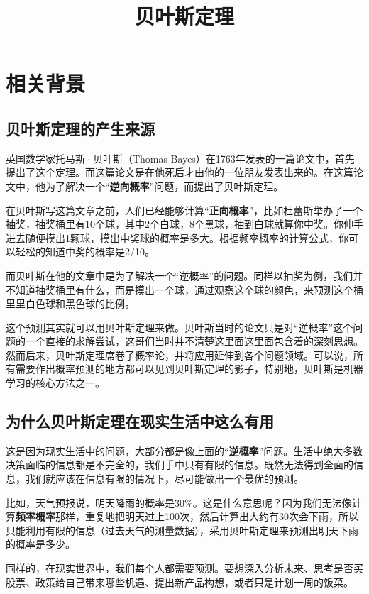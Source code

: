 \documentclass[12pt]{article}
\title{贝叶斯定理\cite{Fantastic_Bayesian_Common_Deduction}\cite{Common_Bayesian_Theory}\cite{Bayesian_Theory_With_Three_Examples}\cite{How_You_Understand_Bayesian}}
\begin{document}
\maketitle
\tableofcontents

\section{相关背景}
\subsection{贝叶斯定理的产生来源}
英国数学家托马斯·贝叶斯（Thomas Bayes）在1763年发表的一篇论文中，首先提出了这个定理。而这篇论文是在他死后才由他的一位朋友发表出来的。在这篇论文中，他为了解决一个“\textbf{逆向概率}”问题，而提出了贝叶斯定理。

在贝叶斯写这篇文章之前，人们已经能够计算“\textbf{正向概率}”，比如杜蕾斯举办了一个抽奖，抽奖桶里有10个球，其中2个白球，8个黑球，抽到白球就算你中奖。你伸手进去随便摸出1颗球，摸出中奖球的概率是多大。根据频率概率的计算公式，你可以轻松的知道中奖的概率是2/10。

而贝叶斯在他的文章中是为了解决一个“逆概率”的问题。同样以抽奖为例，我们并不知道抽奖桶里有什么，而是摸出一个球，通过观察这个球的颜色，来预测这个桶里里白色球和黑色球的比例。

这个预测其实就可以用贝叶斯定理来做。贝叶斯当时的论文只是对“逆概率”这个问题的一个直接的求解尝试，这哥们当时并不清楚这里面这里面包含着的深刻思想。然而后来，贝叶斯定理席卷了概率论，并将应用延伸到各个问题领域。可以说，所有需要作出概率预测的地方都可以见到贝叶斯定理的影子，特别地，贝叶斯是机器学习的核心方法之一。

\subsection{为什么贝叶斯定理在现实生活中这么有用}
这是因为现实生活中的问题，大部分都是像上面的“\textbf{逆概率}”问题。生活中绝大多数决策面临的信息都是不完全的，我们手中只有有限的信息。既然无法得到全面的信息，我们就应该在信息有限的情况下，尽可能做出一个最优的预测。

比如，天气预报说，明天降雨的概率是30\%。这是什么意思呢？因为我们无法像计算\textbf{频率概率}那样，重复地把明天过上100次，然后计算出大约有30次会下雨，所以只能利用有限的信息（过去天气的测量数据），采用贝叶斯定理来预测出明天下雨的概率是多少。

同样的，在现实世界中，我们每个人都需要预测。要想深入分析未来、思考是否买股票、政策给自己带来哪些机遇、提出新产品构想，或者只是计划一周的饭菜。
\end{document}
